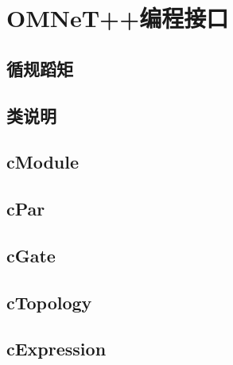 \chapter{OMNeT++编程接口}

\begin{summary}
  \blindtext
\end{summary}

\section{循规蹈矩}
\Blindtext

\section{类说明}
\Blindtext

\section{cModule}
\Blindtext

\section{cPar}
\Blindtext

\section{cGate}
\Blindtext

\section{cTopology}
\Blindtext

\section{cExpression}
\Blindtext


